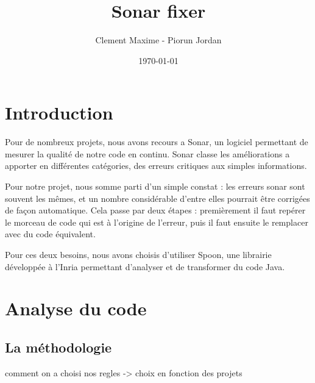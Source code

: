 \documentclass[a4paper]{article}
\begin{document}
\clearpage
\vspace*{\fill}
\begin{center}
\begin{minipage}{.6\textwidth}
\title{Sonar fixer}
\author{Clement Maxime - Piorun Jordan}
\date{\today}
\maketitle
\end{minipage}

\end{center}
\vfill %
\clearpage

\newpage

\section{Introduction}
\par Pour de nombreux projets, nous avons recours a Sonar, un logiciel permettant de mesurer la qualité de notre code en continu. Sonar classe les améliorations a apporter en différentes catégories, des erreurs critiques aux simples informations.
\\
\par Pour notre projet, nous somme parti d'un simple constat : les erreurs sonar sont souvent les mêmes, et un nombre considérable d'entre elles pourrait être corrigées de façon automatique. Cela passe par deux étapes : premièrement il faut repérer le morceau de code qui est à l'origine de l'erreur, puis il faut ensuite le remplacer avec du code équivalent.
\\
\par Pour ces deux besoins, nous avons choisis d'utiliser Spoon, une librairie développée à l'Inria permettant d'analyser et de transformer du code Java.

\newpage
\section{Analyse du code}
\subsection{La méthodologie}
comment on a choisi nos regles -> choix en fonction des projets
\end{document}
